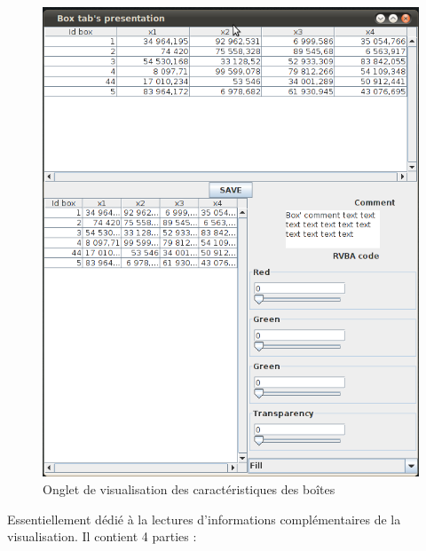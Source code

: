 \documentclass[a4paper]{article}
\begin{document}
\begin{figure}[h]
  \center
  \includegraphics[scale=0.50]{spec-images/Onglet_Box.png}
  \caption{Onglet de visualisation des caractéristiques des boîtes }
\end{figure}
Essentiellement dédié à la lectures d'informations complémentaires de la visualisation. Il contient 4 parties :
\end{document}
